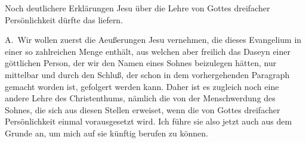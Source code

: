 Noch deutlichere Erklärungen Jesu über die Lehre von Gottes dreifacher Persönlichkeit dürfte das  liefern.\par

\vabst A.~Wir wollen zuerst die Aeußerungen Jesu  vernehmen, die dieses Evangelium in einer so zahlreichen Menge enthält, aus welchen aber freilich das Daseyn einer göttlichen Person, der wir den Namen eines Sohnes beizulegen hätten, nur mittelbar und durch den Schluß, der schon in dem vorhergehenden Paragraph gemacht worden ist, gefolgert werden kann. Daher ist es zugleich noch eine andere Lehre des Christenthums, nämlich die von der Menschwerdung des Sohnes, die sich aus diesen Stellen erweiset, wenn die von Gottes dreifacher Persönlichkeit einmal vorausgesetzt wird. Ich führe sie also jetzt auch aus dem Grunde an, um mich auf sie künftig berufen zu können.~
